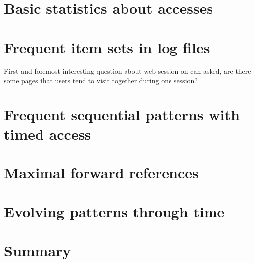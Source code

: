 \documentclass[english,12pt,a4paper]{article}
\begin{document}
\section{Basic statistics about accesses}
\section{Frequent item sets in log files}
First and foremost interesting question about web session on can asked, are there some pages that users tend to visit together during one session?


\section{Frequent sequential patterns with timed access}
\section{Maximal forward references}
\section{Evolving patterns through time}
\section{Summary}
\end{document}
